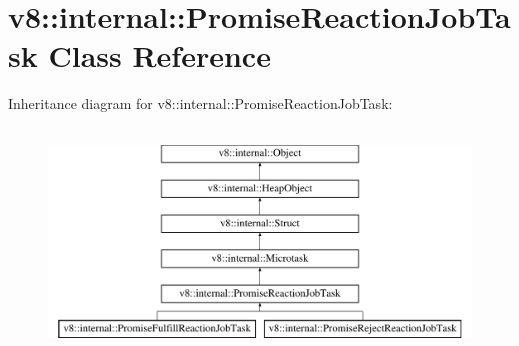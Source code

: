 \hypertarget{classv8_1_1internal_1_1PromiseReactionJobTask}{}\section{v8\+:\+:internal\+:\+:Promise\+Reaction\+Job\+Task Class Reference}
\label{classv8_1_1internal_1_1PromiseReactionJobTask}
Inheritance diagram for v8\+:\+:internal\+:\+:Promise\+Reaction\+Job\+Task\+:\begin{figure}[H]
\begin{center}
\leavevmode
\includegraphics[height=6.000000cm]{classv8_1_1internal_1_1PromiseReactionJobTask}
\end{center}
\end{figure}
